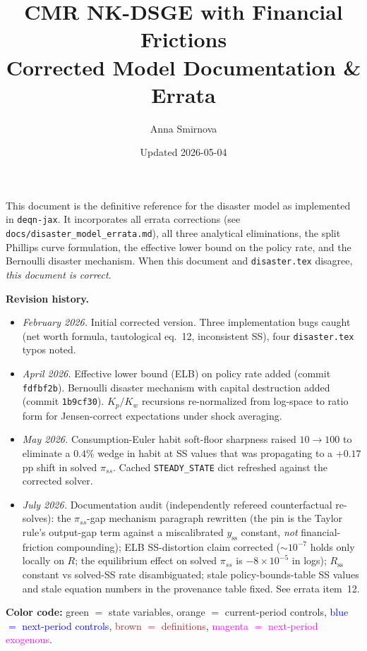 \documentclass[11pt]{article}
\title{CMR NK-DSGE with Financial Frictions\\[4pt]
\large Corrected Model Documentation \& Errata}
\author{Anna Smirnova}
\date{Updated 2026-05-04}
\begin{document}
\maketitle

\noindent This document is the definitive reference for the disaster model as
implemented in \texttt{deqn-jax}. It incorporates all errata corrections
(see \texttt{docs/disaster\_model\_errata.md}), all three analytical
eliminations, the split Phillips curve formulation, the effective lower bound
on the policy rate, and the Bernoulli disaster mechanism. When this document
and \texttt{disaster.tex} disagree, \emph{this document is correct}.

\bigskip\noindent\textbf{Revision history.}
\begin{itemize}
\item \emph{February 2026.} Initial corrected version. Three implementation
  bugs caught (net worth formula, tautological eq.~12, inconsistent SS),
  four \texttt{disaster.tex} typos noted.
\item \emph{April 2026.} Effective lower bound (ELB) on policy rate added
  (commit \texttt{fdfbf2b}). Bernoulli disaster mechanism with capital
  destruction added (commit \texttt{1b9cf30}). $K_p/K_w$ recursions
  re-normalized from log-space to ratio form for Jensen-correct
  expectations under shock averaging.
\item \emph{May 2026.} Consumption-Euler habit soft-floor sharpness raised
  $10 \!\to\! 100$ to eliminate a $0.4\%$ wedge in habit at SS values that
  was propagating to a $+0.17$pp shift in solved $\pi_{ss}$. Cached
  \texttt{STEADY\_STATE} dict refreshed against the corrected solver.
\item \emph{July 2026.} Documentation audit (independently refereed
  counterfactual re-solves): the $\pi_{ss}$-gap mechanism paragraph
  rewritten (the pin is the Taylor rule's output-gap term against a
  miscalibrated $y_{\text{ss}}$ constant, \emph{not} financial-friction
  compounding); ELB SS-distortion claim corrected
  (${\sim}10^{-7}$ holds only locally on $R$; the equilibrium effect on
  solved $\pi_{ss}$ is $-8\times 10^{-5}$ in logs); $R_{\text{ss}}$
  constant vs solved-SS rate disambiguated; stale policy-bounds-table
  SS values and stale equation numbers in the provenance table fixed.
  See errata item~12.
\end{itemize}

\bigskip\noindent
\textbf{Color code:}
\textcolor{green!60!black}{green $=$ state variables},
\textcolor{orange!80!black}{orange $=$ current-period controls},
\textcolor{blue}{blue $=$ next-period controls},
\textcolor{brown}{brown $=$ definitions},
\textcolor{magenta}{magenta $=$ next-period exogenous}.
\end{document}

